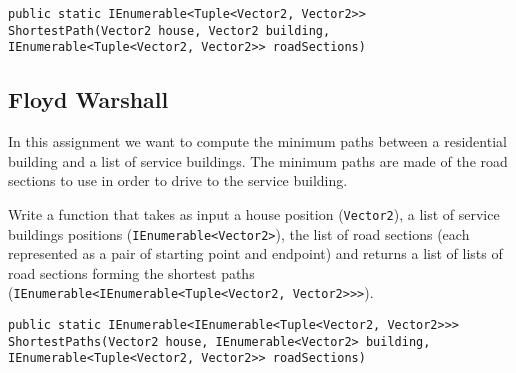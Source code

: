 \documentclass[10pt,a4paper]{article}
\begin{document}
\begin{lstlisting}
public static IEnumerable<Tuple<Vector2, Vector2>> ShortestPath(Vector2 house, Vector2 building, IEnumerable<Tuple<Vector2, Vector2>> roadSections)
\end{lstlisting}

\subsection*{Floyd Warshall}
In this assignment we want to compute the minimum paths between a residential building and a list of service buildings. The minimum paths are made of the road sections to use in order to drive to the service building.

Write a function that takes as input a house position (\texttt{Vector2}), a list of service buildings positions (\texttt{IEnumerable<Vector2>}), the list of road sections (each represented as a pair of starting point and endpoint) and returns a list of lists of road sections forming the shortest paths (\texttt{IEnumerable<IEnumerable<Tuple<Vector2, Vector2>>>}).

\begin{lstlisting}
public static IEnumerable<IEnumerable<Tuple<Vector2, Vector2>>> ShortestPaths(Vector2 house, IEnumerable<Vector2> building, IEnumerable<Tuple<Vector2, Vector2>> roadSections)
\end{lstlisting}
\end{document}
